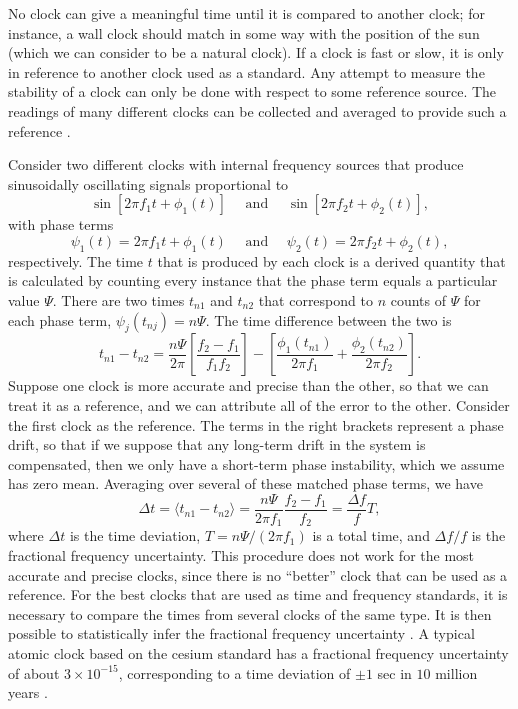 No clock can give a meaningful time until it is compared to another clock; for instance, a wall clock should match in some way with the position of the sun (which we can consider to be a natural clock). If a clock is fast or slow, it is only in reference to another clock used as a standard. Any attempt to measure the stability of a clock can only be done with respect to some reference source. The readings of many different clocks can be collected and averaged to provide such a reference \cite{BIPM, BIPM2}. 

Consider two different clocks with internal frequency sources that produce sinusoidally oscillating signals proportional to
%
\begin{equation}
\sin\left[2\pi f_1t + \phi_1(t)\right] \quad \text{ and } \quad \sin\left[2\pi f_2t + \phi_2(t)\right],
\end{equation}
%
with phase terms
%
\begin{equation}
\psi_1(t) = 2\pi f_1t + \phi_1(t) \quad \text{ and } \quad \psi_2(t) = 2\pi f_2t + \phi_2(t),
\end{equation}
%
respectively. The time $t$ that is produced by each clock is a derived quantity that is calculated by counting every instance that the phase term equals a particular value $\Psi$. There are two times $t_{n1}$ and $t_{n2}$ that correspond to $n$ counts of $\Psi$ for each phase term, $\psi_j(t_{nj}) = n\Psi$. The time difference between the two is
%
\begin{equation}
t_{n1} - t_{n2} = \frac{n\Psi}{2\pi}\left[\frac{f_2 - f_1}{f_1f_2}\right] - \left[\frac{\phi_1(t_{n1})}{2\pi f_1} + \frac{\phi_2(t_{n2})}{2\pi f_2}\right].
\end{equation}
%
Suppose one clock is more accurate and precise than the other, so that we can treat it as a reference, and we can attribute all of the error to the other. Consider the first clock as the reference.
The terms in the right brackets represent a phase drift, so that if we suppose that any long-term drift in the system is compensated, then we only have a short-term phase instability, which we assume has zero mean. Averaging over several of these matched phase terms, we have
%
\begin{equation}
\Delta t = \langle t_{n1} - t_{n2} \rangle = \frac{n\Psi}{2\pi f_1}\frac{f_2 - f_1}{f_2} = \frac{\Delta f}{f}T,
\end{equation}
%
where $\Delta t$ is the time deviation, $T=n\Psi/(2\pi f_1)$ is a total time, and $\Delta f/f$ is the fractional frequency uncertainty. This procedure does not work for the most accurate and precise clocks, since there is no ``better'' clock that can be used as a reference. For the best clocks that are used as time and frequency standards, it is necessary to compare the times from several clocks of the same type. It is then possible to statistically infer the fractional frequency uncertainty \cite{blair1974time}. A typical atomic clock based on the cesium standard has a fractional frequency uncertainty of about $3 \times 10^{-15}$, corresponding to a time deviation of $\pm 1$ sec in $10$ million years \cite{CsFracFreq}.

